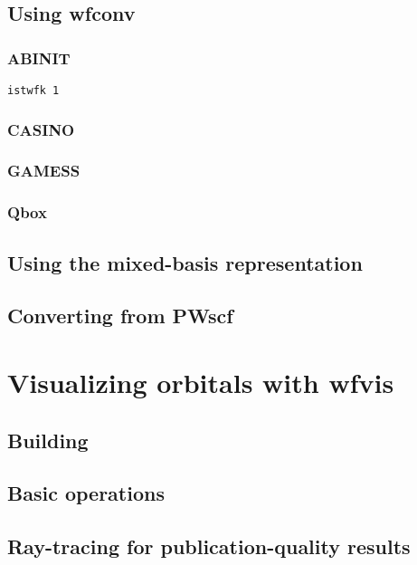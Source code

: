 \subsection{Using wfconv}
\subsubsection{ABINIT}
\texttt{istwfk 1}
\subsubsection{CASINO}
\subsubsection{GAMESS}
\subsubsection{Qbox}
\subsection{Using the mixed-basis representation}

\subsection{Converting from PWscf}


\section{Visualizing orbitals with wfvis}
\subsection{Building}
\subsection{Basic operations}
\subsection{Ray-tracing for publication-quality results}
